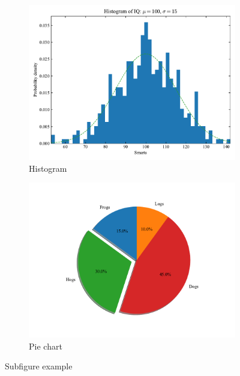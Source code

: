 \begin{figure}[!htp]
	\centering
    \begin{subfigure}{0.45\textwidth}
        \centering
	    \includegraphics[width=1\textwidth]{figures/histogram.pdf}
        {Histogram}
    \end{subfigure}
    \begin{subfigure}{0.45\textwidth}
        \centering
	    \includegraphics[width=1\textwidth]{figures/piechart.pdf}
        {Pie chart}
    \end{subfigure}
    {Subfigure example}
    \label{fig:subfig}
\end{figure}

